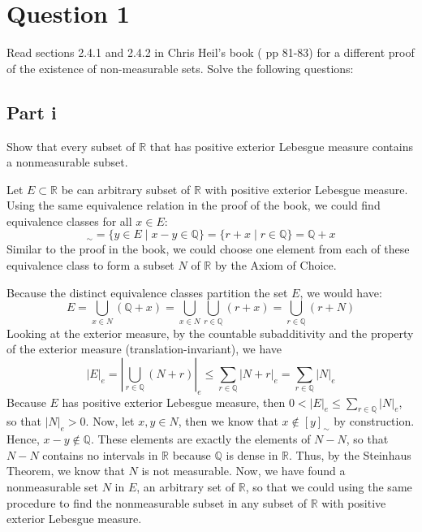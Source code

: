 \section{Question 1}

\begin{question}
    Read sections 2.4.1 and 2.4.2 in Chris Heil's book ( $\mathrm{pp}$ 81-83) for a different proof of the existence of non-measurable sets. Solve the following questions:
\end{question}

\subsection{Part i}

\begin{question}
    Show that every subset of $\mathbb{R}$ that has positive exterior Lebesgue measure contains a nonmeasurable subset.
\end{question}

\begin{answer}
    Let $E \subset \mathbb{R}$ be can arbitrary subset of $\mathbb{R}$ with positive exterior Lebesgue  measure. Using the same equivalence relation in the proof of the book, we could find equivalence classes for all $x \in E$:
    \begin{equation}
        [x]_{\sim} = \{y \in E \mid x - y \in \mathbb{Q}\} = \{r + x \mid r \in \mathbb{Q}\} = \mathbb{Q} + x
    \end{equation}
    Similar to the proof in the book, we could choose one element from each of these equivalence class to form a subset $N$ of $\mathbb{R}$ by the Axiom of Choice.
    
    Because the distinct equivalence classes partition the set $E$, we would have:
    \begin{equation}
        E  = \bigcup_{x \in N}(\mathbb{Q} + x) = \bigcup_{x \in N} \bigcup_{r \in \mathbb{Q}}(r + x) = \bigcup_{r \in \mathbb{Q}}(r + N)
    \end{equation}
    Looking at the exterior measure, by the countable subadditivity and the property of the exterior measure (translation-invariant), we have
    \begin{equation}
        \lvert E \rvert_e = \left\lvert \bigcup_{r \in \mathbb{Q}}(N+r) \right\rvert_e \leq \sum_{r \in \mathbb{Q}} \lvert N + r\rvert_e = \sum_{r \in \mathbb{Q}}\lvert N \rvert_e
    \end{equation}
    Because $E$ has positive exterior Lebesgue measure, then $0 < \lvert E \rvert_e \leq \sum_{r \in \mathbb{Q}}\lvert N \rvert_e$, so that $\lvert N \rvert_e > 0$. Now, let $x,y \in N$, then we know that $x \notin [y]_{\sim}$ by construction. Hence, $x - y \notin\mathbb{Q}$. These elements are exactly the elements of $N-N$, so that $N-N$ contains no intervals in $\mathbb{R}$ because $\mathbb{Q}$ is dense in $\mathbb{R}$. Thus, by the Steinhaus Theorem, we know that $N$ is not measurable. Now, we have found a nonmeasurable set $N$ in $E$, an arbitrary set of $\mathbb{R}$, so that we could using the same procedure to find the nonmeasurable subset in any subset of $\mathbb{R}$ with positive exterior Lebesgue measure.
\end{answer}

